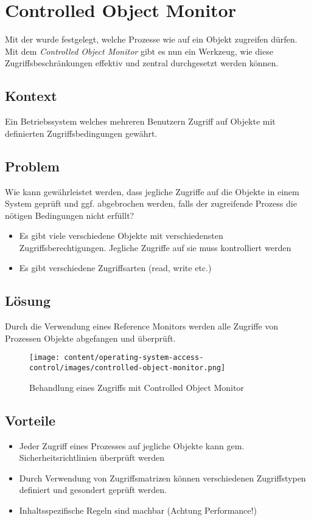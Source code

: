 \section{Controlled Object Monitor}
Mit der  wurde festgelegt, welche Prozesse wie auf ein Objekt zugreifen dürfen. Mit dem \emph{Controlled Object Monitor} gibt es nun ein Werkzeug, wie diese Zugriffsbeschränkungen effektiv und zentral durchgesetzt werden können.

\subsection*{Kontext}
Ein Betriebssystem welches mehreren Benutzern Zugriff auf Objekte mit definierten Zugriffsbedingungen gewährt.

\subsection*{Problem}
Wie kann gewährleistet werden, dass jegliche Zugriffe auf die Objekte in einem System geprüft und ggf. abgebrochen werden, falls der zugreifende Prozess die nötigen Bedingungen nicht erfüllt?

\begin{itemize}
	\item Es gibt viele verschiedene Objekte mit verschiedensten Zugriffsberechtigungen. Jegliche Zugriffe auf sie muss kontrolliert werden
	\item Es gibt verschiedene Zugriffsarten (read, write etc.)
\end{itemize}


\subsection*{Lösung}
Durch die Verwendung eines Reference Monitors werden alle Zugriffe von Prozessen Objekte abgefangen und überprüft.

\begin{figure}[H]
	\texttt{[image: content/operating-system-access-control/images/controlled-object-monitor.png]}
	\caption{Behandlung eines Zugriffs mit Controlled Object Monitor \cite{SecPatterns06}}
\end{figure}


\subsection*{Vorteile}
\begin{itemize}
	\item Jeder Zugriff eines Prozesses auf jegliche Objekte kann gem. Sicherheitsrichtlinien überprüft werden
	\item Durch Verwendung von Zugriffsmatrizen können verschiedenen Zugriffstypen definiert und gesondert geprüft werden.
	\item Inhaltsspezifische Regeln sind machbar (Achtung Performance!)
\end{itemize}


